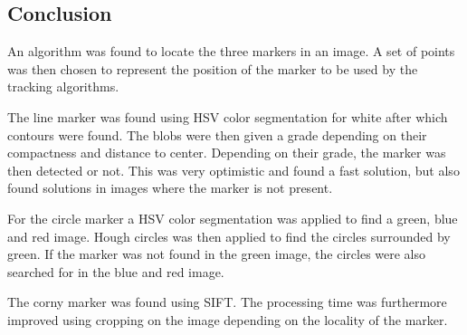 \subsection{Conclusion}
An algorithm was found to locate the three markers in an image.
A set of points was then chosen to represent the position of the marker to be used by the tracking algorithms.

The line marker was found using HSV color segmentation for white after which contours were found.
The blobs were then given a grade depending on their compactness and distance to center.
Depending on their grade, the marker was then detected or not.
This was very optimistic and found a fast solution, but also found solutions in images where the marker is not present.

For the circle marker a HSV color segmentation was applied to find a green, blue and red image.
Hough circles was then applied to find the circles surrounded by green.
If the marker was not found in the green image, the circles were also searched for in the blue and red image.

The corny marker was found using SIFT.
The processing time was furthermore improved using cropping on the image depending on the locality of the marker.



